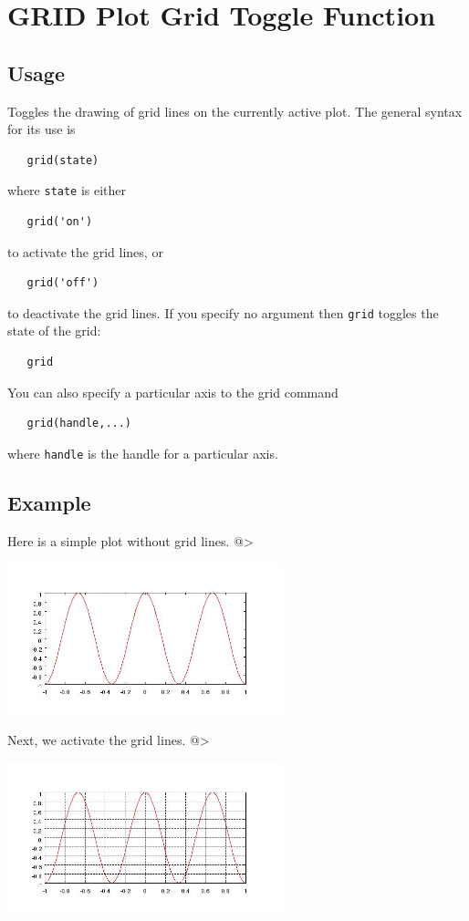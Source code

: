 \section{GRID Plot Grid Toggle Function}

\subsection{Usage}

Toggles the drawing of grid lines on the currently active plot.  The
general syntax for its use is
\begin{verbatim}
   grid(state)
\end{verbatim}
where \verb|state| is either
\begin{verbatim}
   grid('on')
\end{verbatim}
to activate the grid lines, or
\begin{verbatim}
   grid('off')
\end{verbatim}
to deactivate the grid lines.  If you specify no argument then
\verb|grid| toggles the state of the grid:
\begin{verbatim}
   grid
\end{verbatim}
You can also specify a particular axis to the grid command
\begin{verbatim}
   grid(handle,...)
\end{verbatim}
where \verb|handle| is the handle for a particular axis.
\subsection{Example}

Here is a simple plot without grid lines.
@>


\centerline{\includegraphics[width=8cm]{grid1}}


Next, we activate the grid lines.
@>


\centerline{\includegraphics[width=8cm]{grid2}}

